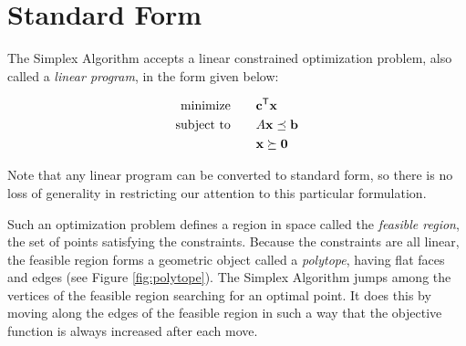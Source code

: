 \label{lab:Simplex}
\labdependencies{}


\section*{Standard Form} %

The Simplex Algorithm accepts a linear constrained optimization problem, also called a \emph{linear program}, in the form given below:

\begin{align*}
\text{minimize}\qquad &\mathbf{c}^{\mathsf T}\mathbf{x} \\
\text{subject to}\qquad & A\mathbf{x} \preceq \mathbf{b} \\
 &\mathbf{x} \succeq \mathbf{0}
\end{align*}

Note that any linear program can be converted to standard form, so there is no loss of generality in restricting our attention to this particular formulation.

Such an optimization problem defines a region in space called the \emph{feasible region}, the set of points satisfying the constraints.
Because the constraints are all linear, the feasible region forms a geometric object called a \emph{polytope}, having flat faces and edges (see Figure \ref{fig:polytope}).
The Simplex Algorithm jumps among the vertices of the feasible region searching for an optimal point.
It does this by moving along the edges of the feasible region in such a way that the objective function is always increased after each move.


